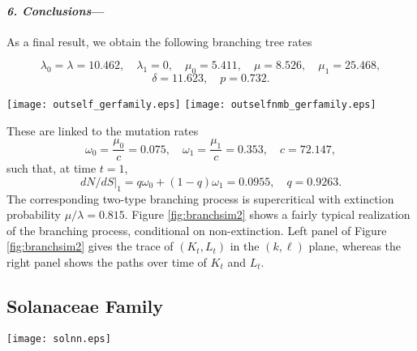 \documentclass[a4paper,11pt]{article}
\theoremstyle{plain}
\theoremstyle{definition}
\numberwithin{equation}{section}
\begin{document}
\paragraph{\textit{6. Conclusions}---}As a final result, we obtain the following
branching tree rates 

\[
\lambda_0 =\lambda=10.462,\quad \lambda_1=0, \quad
 \mu_0=5.411, \quad \mu=8.526,  \quad \mu_1=25.468,
 \]
 \[ 
\delta=11.623,\quad  p=0.732.
\]


\begin{figure*}[!t]
\centerline{
\texttt{[image: outself\_gerfamily.eps]}
\texttt{[image: outselfnmb\_gerfamily.eps]}}
\caption{Simulation of a two-type branching process 
with $\omega_0=0.075$,  $\omega_1=0.353$, 
$\lambda_1=0$, $\lambda=10.462$, $ \mu=8.526$, 
  $ p=0.732$, $\delta=11.623$,  $\mu_0=5.411$ 
  and $\mu_1=25.468$. The left plot gives the trace of $(K_t,L_t)$ in the
$(k,\ell)$ plane; Plot on the right shows the paths over time of
$K_t$ and $L_t$ in blue and red, respectively. }
\label{fig:branchsim2}  
\end{figure*}



\noindent These are linked to the mutation rates 
\[
\omega_0=\frac{\mu_0}{c}=0.075, \quad \omega_1=\frac{\mu_1}{c}=0.353, \quad c=72.147,
\]
such that, at time $t=1$,
\[
dN/dS|_1= q\omega_0+(1-q)\omega_1=0.0955,\quad  q=0.9263.
\]
The corresponding two-type branching process is supercritical with
extinction probability $\mu/\lambda= 0.815$. Figure \ref{fig:branchsim2} shows a fairly typical
realization of the branching process, conditional on
non-extinction. Left panel of Figure \ref{fig:branchsim2} gives the trace of $(K_t,L_t)$ in the
$(k,\ell)$ plane, whereas the right panel shows the paths over time of
$K_t$ and $L_t$.


\subsection*{Solanaceae Family}


\begin{figure*}[!t]
\centerline{\texttt{[image: solnn.eps]}}
\caption{Ultrametric phylogenetic tree consisting of $83$ 
species in the Solanaceae family. Outcrosser 
branches are colored blue; the selfer branches, from bifurcation time onward,
are given in red.}
\label{soln_phylogeny_ultra}
\end{figure*}
\end{document}
